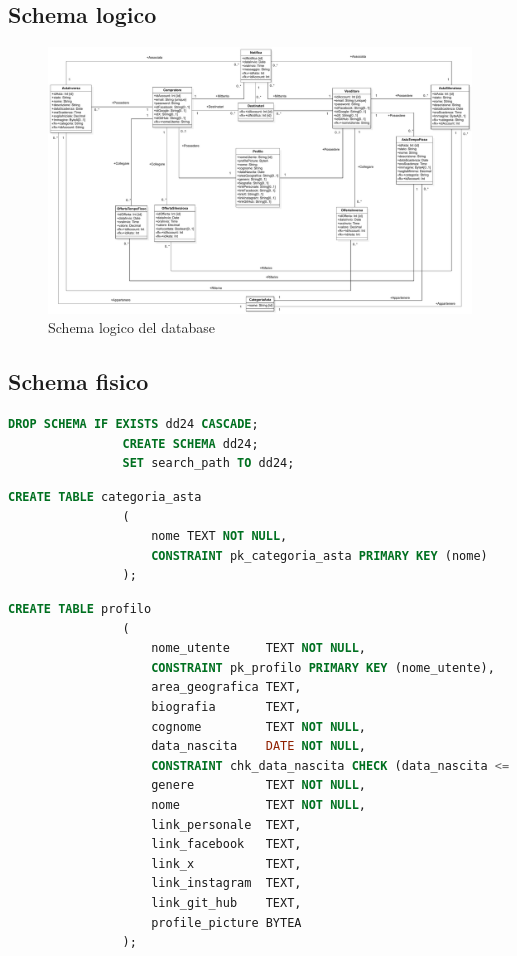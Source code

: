         \subsection{Schema logico}
            \begin{figure}[htbp!]
                \centering
                    \includegraphics[width=0.73\linewidth]{Immagini/Diagrammi/Class Diagram/Design/ClassDiagramDatabaseLogico.pdf}
                \caption{Schema logico del database}
                \label{fig:Schema logico del database}
            \end{figure}

        \clearpage
        
        \subsection{Schema fisico}
            \begin{lstlisting}[language=SQL, caption=Preparazione ambiente]
                DROP SCHEMA IF EXISTS dd24 CASCADE;
                CREATE SCHEMA dd24;
                SET search_path TO dd24;
            \end{lstlisting}
                        
            \begin{lstlisting}[language=SQL, caption=Relazione categoria asta]
                CREATE TABLE categoria_asta
                (
                    nome TEXT NOT NULL,
                    CONSTRAINT pk_categoria_asta PRIMARY KEY (nome)
                );
            \end{lstlisting}
            
            \begin{lstlisting}[language=SQL, caption=Relazione profilo]
                CREATE TABLE profilo
                (
                    nome_utente     TEXT NOT NULL,
                    CONSTRAINT pk_profilo PRIMARY KEY (nome_utente),
                    area_geografica TEXT,
                    biografia       TEXT,
                    cognome         TEXT NOT NULL,
                    data_nascita    DATE NOT NULL,
                    CONSTRAINT chk_data_nascita CHECK (data_nascita <= NOW()),
                    genere          TEXT NOT NULL,
                    nome            TEXT NOT NULL,
                    link_personale  TEXT,
                    link_facebook   TEXT,
                    link_x          TEXT,
                    link_instagram  TEXT,
                    link_git_hub    TEXT,
                    profile_picture BYTEA
                );
            \end{lstlisting}
            
